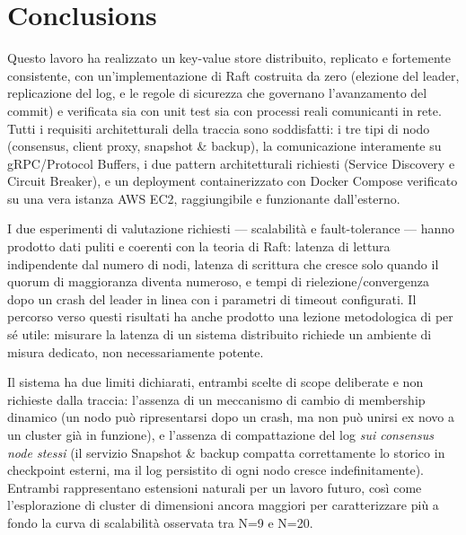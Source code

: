 \documentclass[conference]{IEEEtran}
\begin{document}
\section{Conclusions}
\label{sec:conclusions}

Questo lavoro ha realizzato un key-value store distribuito, replicato e
fortemente consistente, con un'implementazione di Raft costruita da zero
(elezione del leader, replicazione del log, e le regole di sicurezza che
governano l'avanzamento del commit) e verificata sia con unit test sia con
processi reali comunicanti in rete. Tutti i requisiti architetturali della
traccia sono soddisfatti: i tre tipi di nodo (consensus, client proxy,
snapshot \& backup), la comunicazione interamente su gRPC/Protocol
Buffers, i due pattern architetturali richiesti (Service Discovery e
Circuit Breaker), e un deployment containerizzato con Docker Compose
verificato su una vera istanza AWS EC2, raggiungibile e funzionante
dall'esterno.

I due esperimenti di valutazione richiesti — scalabilità e
fault-tolerance — hanno prodotto dati puliti e coerenti con la teoria di
Raft: latenza di lettura indipendente dal numero di nodi, latenza di
scrittura che cresce solo quando il quorum di maggioranza diventa
numeroso, e tempi di rielezione/convergenza dopo un crash del leader in
linea con i parametri di timeout configurati. Il percorso verso questi
risultati ha anche prodotto una lezione metodologica di per sé utile:
misurare la latenza di un sistema distribuito richiede un ambiente di
misura dedicato, non necessariamente potente.

Il sistema ha due limiti dichiarati, entrambi scelte di scope deliberate e
non richieste dalla traccia: l'assenza di un meccanismo di cambio di
membership dinamico (un nodo può ripresentarsi dopo un crash, ma non può
unirsi ex novo a un cluster già in funzione), e l'assenza di compattazione
del log \emph{sui consensus node stessi} (il servizio Snapshot \& backup
compatta correttamente lo storico in checkpoint esterni, ma il log
persistito di ogni nodo cresce indefinitamente). Entrambi rappresentano
estensioni naturali per un lavoro futuro, così come l'esplorazione di
cluster di dimensioni ancora maggiori per caratterizzare più a fondo la
curva di scalabilità osservata tra N=9 e N=20.



\end{document}
